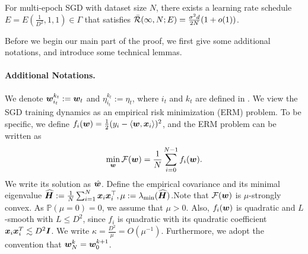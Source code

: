 

\begin{theorem} \label{thm:optimality-multi-epoch}
    For multi-epoch SGD with dataset size $N$, there exists a learning rate schedule $E=E(\frac{1}{D^2},1,1)\in\Gamma$ that satisfies $\Bar{\mathcal{R}}(\infty,N;E) = \frac{\sigma^2d}{2N}(1+o(1))$.
\end{theorem}
Before we begin our main part of the proof, we first give some additional notations, and introduce some technical lemmas.
\paragraph{Additional Notations.}    We denote ${\bm{w}}_{i_t}^{k_t}:={\bm{w}}_t$ and $\eta_{i_t}^{k_t}:=\eta_t$, where $i_t$ and $k_t$ are defined in . We view the SGD training dynamics as an empirical risk minimization (ERM) problem. To be specific, we define $f_i({\bm{w}})=\frac{1}{2}(y_i-\langle{\bm{w}}, {\bm{x}}_i\rangle)^2$, and the ERM problem can be written as \[\min_{\bm{w}}\mathcal{F}({\bm{w}})=\frac{1}{N}\sum_{i=0}^{N-1}f_i({\bm{w}}).\]
    We write its solution as $\hat{{\bm{w}}}$. Define the empirical covariance and its minimal eigenvalue $
\widehat{{\bm{H}}}:=\frac{1}{N}\sum_{i=1}^N {\bm{x}}_i{\bm{x}}_i^\top,
\mu:=\lambda_{\min}(\widehat{{\bm{H}}})$.Note that $\mathcal{F}({\bm{w}})$ is $\mu$-strongly convex. As $\mathds{P}(\mu=0)=0$, we assume that $\mu>0$. Also, $f_i({\bm{w}})$ is quadratic and $L$-smooth with $L\leq D^2$, since $f_i$ is quadratic with its quadratic coefficient ${\bm{x}}_i{\bm{x}}_i^T\lesssim D^2{\bm{I}}$. We write $\kappa=\frac{D^2}{\mu}=O\left(\mu^{-1}\right)$. Furthermore, we adopt the convention that ${\bm{w}}_{N}^k = {\bm{w}}_{0}^{k+1}$. 
    
